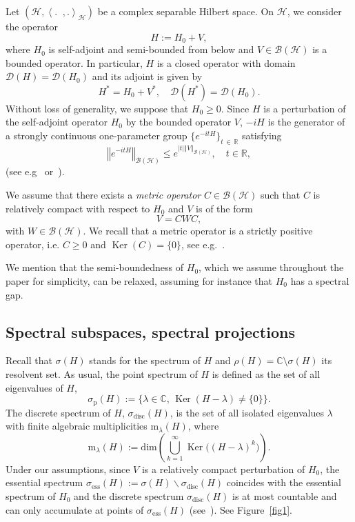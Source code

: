 \documentclass[10pt]{amsart}
\theoremstyle{definition}\newtheorem{defi}[theo]{Definition}\newtheorem{rema}[theo]{Remark}\newtheorem{exam}[theo]{Example}\newtheorem{exem}[theo]{Example}\newtheorem{nota}[theo]{Notation}
\newcommand{\Hi}{\mathcal{H}}
\newcommand{\bbC}{\mathbb{C}}
\newcommand{\R}{\mathbb{R}}
\newcommand{\ess}{\mathrm{ess}}
\newcommand{\rmp}{\mathrm{p}}
\newcommand{\rmm}{\mathrm{m}}
\newcommand{\disc}{\mathrm{disc}}
\newcommand{\norme}[1]{\left\Vert #1\right\Vert}
\newcommand{\scal}[2]{\left\langle{#1} \middle., {#2}\right\rangle}
\newcommand{\abso}[1]{\left|{#1}\right|}
\newcommand{\clB}{\mathcal{B}}
\newcommand{\clD}{\mathcal{D}}
\DeclareMathOperator{\Ker}{Ker}
\begin{document}
Let $(\Hi,\scal{.}{.}_\Hi)$ be a complex separable Hilbert space. On $\Hi$, we consider the operator
\begin{equation}\label{eq:defH}
H:=H_0+V,
\end{equation}
where $H_0$ is self-adjoint and semi-bounded from below and $V\in\clB(\Hi)$ is a bounded operator. In particular, $H$ is a closed operator with domain $\clD(H)=\clD(H_0)$ and its adjoint is given by
\begin{equation*}
H^*=H_0+V^*, \quad \clD(H^*)=\clD(H_0).
\end{equation*}
Without loss of generality, we suppose that $H_0\geq 0$. Since $H$ is a perturbation of the self-adjoint operator $H_0$ by the bounded operator $V$, $-iH$ is the generator of a strongly continuous one-parameter group $\lbrace e^{-itH}\rbrace_{t\,\in\,\R}$ satisfying
\begin{equation*}
\norme{e^{-itH}}_{\clB(\Hi)}\leq e^{\abso{t}\norme{V}_{\clB(\Hi)}},\quad t\in\R,
\end{equation*}
(see e.g~\cite{Da07_01} or~\cite{EnNa20_01}).

We assume that there exists a \emph{metric operator} $C\in\clB(\Hi)$ such that $C$ is relatively compact with respect to $H_0$ and $V$ is of the form
\begin{equation}\label{eq:CWC}
V=CWC,
\end{equation}
with $W\in\clB(\Hi)$. We recall that a metric operator is a strictly positive operator, i.e. $C\ge0$ and $\Ker(C)=\{0\}$, see e.g.~\cite{AnTr12_12}.

We mention that the semi-boundedness of $H_0$, which we assume throughout the paper for simplicity, can be relaxed, assuming for instance that $H_0$ has a spectral gap.


\subsection{Spectral subspaces, spectral projections}\label{subsec:subspaces}

Recall that $\sigma(H)$ stands for the spectrum of $H$ and $\rho(H)=\bbC\setminus\sigma(H)$ its resolvent set. As usual, the point spectrum of $H$ is defined as the set of all eigenvalues of $H$,
\begin{equation*}
\sigma_{\rmp}(H):=\big\{\lambda \in \bbC, \, \Ker(H-\lambda)\neq\{0\}\big\}.
\end{equation*}
The discrete spectrum of $H$, $\sigma_\disc(H)$, is the set of all isolated eigenvalues $\lambda$ with finite algebraic multiplicities $\rmm_\lambda(H)$, where
\begin{equation*}
\rmm_\lambda(H):=\mathrm{dim}\left(\bigcup_{k=1}^\infty\Ker\big((H-\lambda)^k \big) \right).
\end{equation*}
Under our assumptions, since $V$ is a relatively compact perturbation of $H_0$, the essential spectrum $\sigma_{\ess}(H):=\sigma(H)\backslash\sigma_\disc(H)$ coincides with the essential spectrum of $H_0$ and the discrete spectrum $\sigma_{\disc}(H)$ is at most countable and can only accumulate at points of $\sigma_{\ess}(H)$ (see~\cite[Corollary~2 of Theorem~XIII.14]{ReSi80_01}). See Figure~\ref{fig1}.
\end{document}
